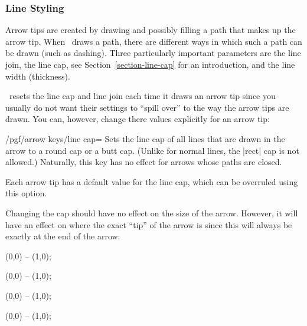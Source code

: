 \subsubsection{Line Styling}
\label{section-arrow-key-caps}

Arrow tips are created by drawing and possibly filling a path that makes up the
arrow tip. When \tikzname\ draws a path, there are different ways in which such
a path can be drawn (such as dashing). Three particularly important parameters
are the line join, the line cap, see Section~\ref{section-line-cap} for an
introduction, and the line width (thickness).

\tikzname\ resets the line cap and line join each time it draws an arrow tip
since you usually do not want their settings to ``spill over'' to the way the
arrow tips are drawn. You can, however, change there values explicitly for an
arrow tip:

\begin{key}{/pgf/arrow keys/line cap=}
    Sets the line cap of all lines that are drawn in the arrow to a round cap
    or a butt cap. (Unlike for normal lines, the |rect| cap is not allowed.)
    Naturally, this key has no effect for arrows whose paths are closed.

    Each arrow tip has a default value for the line cap, which can be overruled
    using this option.

    Changing the cap should have no effect on the size of the arrow. However,
    it will have an effect on where the exact ``tip'' of the arrow is since
    this will always be exactly at the end of the arrow:
\begin{codeexample}[width=3cm]
\tikz [line width=2mm]
  \draw [arrows = {-Computer Modern Rightarrow[line cap=butt]}]
        (0,0) -- (1,0);
\end{codeexample}
\begin{codeexample}[width=3cm]
\tikz [line width=2mm]
  \draw [arrows = {-Computer Modern Rightarrow[line cap=round]}]
        (0,0) -- (1,0);
\end{codeexample}
\begin{codeexample}[width=3cm]
\tikz [line width=2mm]
  \draw [arrows = {-Bracket[reversed,line cap=butt]}]
        (0,0) -- (1,0);
\end{codeexample}
\begin{codeexample}[width=3cm]
\tikz [line width=2mm]
  \draw [arrows = {-Bracket[reversed,line cap=round]}]
        (0,0) -- (1,0);
\end{codeexample}
\end{key}

